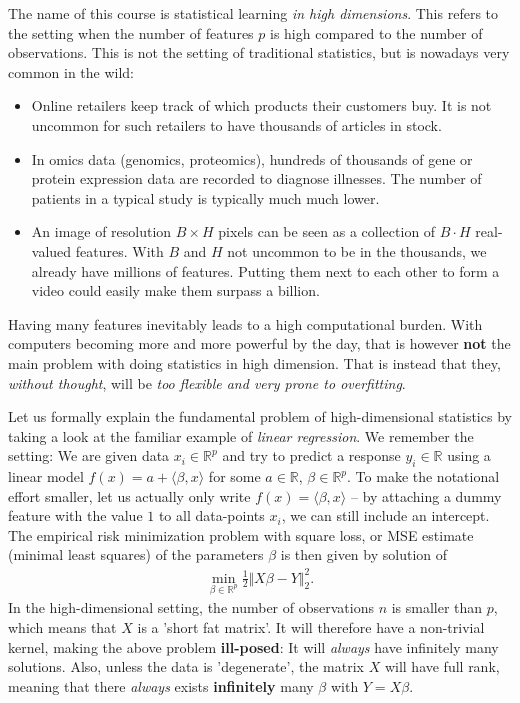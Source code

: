 \documentclass{article}
\newcommand{\sprod}[1]{\langle #1 \rangle}
\newcommand{\R}{\mathbb{R}}
\newcommand{\norm}[1]{\Vert #1 \Vert}
\begin{document}
The name of this course is statistical learning \emph{in high dimensions}. This refers to the setting when the number of features $p$ is high compared to the number of observations. This is not the setting of traditional statistics, but is nowadays very common in the wild:
\begin{itemize}
    \item Online retailers keep track of which products their customers buy. It is not uncommon for such retailers to have thousands of articles in stock. 
    \item In omics data (genomics, proteomics), hundreds of thousands of gene or protein expression data are recorded to diagnose illnesses. The number of patients in a typical study is typically much much lower.
    \item An image of resolution $B\times H$ pixels can be seen as a collection of $B\cdot H$ real-valued features. With $B$ and $H$ not uncommon to be in the thousands, we already have millions of features. Putting them next to each other to form a video could easily make them surpass a billion.
\end{itemize}
Having many features inevitably leads to a high computational burden. With computers becoming more and more powerful by the day, that is however \textbf{not} the main problem with doing statistics in high dimension. That is instead that they, \emph{without thought}, will be \emph{too flexible and very prone to overfitting}.

Let us formally explain the fundamental problem of high-dimensional statistics by taking a look at the familiar example of \emph{linear regression}. We remember the setting: We are given data $x_i \in \R^p$ and try to predict a response $y_i\in \R$ using a linear model $f(x)= a+ \sprod{\beta,x}$ for some $a\in \R$, $\beta \in \R^p$. To make the notational effort smaller, let us actually only write $f(x)=\sprod{\beta,x}$ -- by attaching a dummy feature with the value $1$ to all data-points $x_i$, we can still include an intercept. The empirical risk minimization problem with square loss, or MSE estimate (minimal least squares) of the parameters $\beta$ is then given by solution of
\begin{align}
    \min_{\beta \in \R^p} \tfrac{1}{2}\norm{X\beta-Y}_2^2. \label{eq:linreg}
\end{align}
In the high-dimensional setting, the number of observations $n$ is smaller than $p$, which means that $X$ is a 'short fat matrix'. It will therefore have  a non-trivial kernel, making the above problem \textbf{ill-posed}: It will \emph{always} have infinitely many solutions. Also, unless the data is 'degenerate', the matrix $X$ will have full rank, meaning that there \emph{always} exists \textbf{infinitely} many $\beta$ with $Y=X\beta$. 
\end{document}
